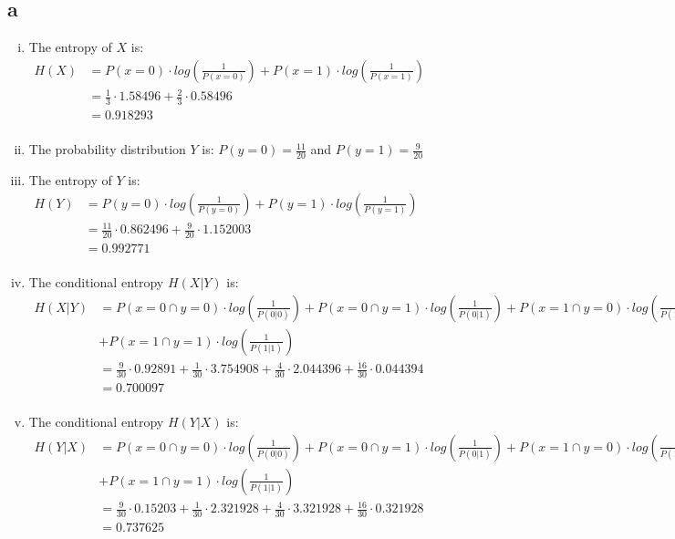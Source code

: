 \documentclass[letterpaper,notitlepage,twoside]{article}
\begin{document}
\subsection*{a}
\begin{enumerate}[(i)]

\item The entropy of  $X$ is:\\
$\begin{aligned}
H(X) &= P(x = 0) \cdot log(\frac{1}{P(x = 0)}) + P(x = 1) \cdot log(\frac{1}{P(x = 1)}) \\
&= \frac{1}{3} \cdot 1.58496 + \frac{2}{3} \cdot 0.58496 \\
&= 0.918293 \\ 
\end{aligned}$

\item The probability distribution $Y$ is: $P(y = 0) = \frac{11}{20}$ and $P(y = 1) = \frac{9}{20}$ \\

\item The entropy of $Y$ is: \\
$\begin{aligned}
H(Y) &= P(y = 0) \cdot log(\frac{1}{P(y = 0)}) + P(y = 1) \cdot log(\frac{1}{P(y = 1)}) \\
&= \frac{11}{20} \cdot 0.862496 + \frac{9}{20} \cdot 1.152003 \\
&= 0.992771 \\
\end{aligned}$

\item The conditional entropy $H(X | Y)$ is: \\
$\begin{aligned}
H(X|Y) &= P(x = 0 \cap y = 0) \cdot log(\frac{1}{P(0|0)}) + P(x = 0 \cap y = 1) \cdot log(\frac{1}{P(0|1)}) + P(x = 1 \cap y = 0) \cdot log(\frac{1}{P(1|0)}) \\ 
&+ P(x = 1 \cap y = 1) \cdot log(\frac{1}{P(1|1)}) \\
&= \frac{9}{30} \cdot 0.92891 + \frac{1}{30} \cdot 3.754908 + \frac{4}{30} \cdot 2.044396 + \frac{16}{30} \cdot 0.044394 \\
&= 0.700097 \\
\end{aligned}$

\item The conditional entropy $H(Y | X)$ is: \\
$\begin{aligned}
H(Y|X) &= P(x = 0 \cap y = 0) \cdot log(\frac{1}{P(0|0)}) + P(x = 0 \cap y = 1) \cdot log(\frac{1}{P(0|1)}) + P(x = 1 \cap y = 0) \cdot log(\frac{1}{P(1|0)}) \\ &+ P(x = 1 \cap y = 1) \cdot log(\frac{1}{P(1|1)}) \\
&= \frac{9}{30} \cdot 0.15203 + \frac{1}{30} \cdot 2.321928 + \frac{4}{30} \cdot 3.321928 + \frac{16}{30} \cdot 0.321928 \\
&= 0.737625 \\
\end{aligned}$


\end{enumerate}
\end{document}
